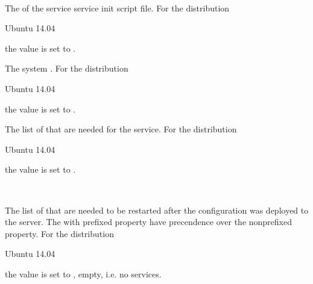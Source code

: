 \\

The  of the service service init script file.
For the distribution
\begin{inparaitem}
\item[\TheDistribution{ubuntu}] Ubuntu 14.04
\end{inparaitem}
the value is set to .


The system . 
For the distribution
\begin{inparaitem}
\item[\TheDistribution{ubuntu}] Ubuntu 14.04
\end{inparaitem}
the value is set to .


The list of  that are needed for the service.
For the distribution
\begin{inparaitem}
\item[\TheDistribution{ubuntu}] Ubuntu 14.04
\end{inparaitem}
the value is set to .

\\

The list of  that are needed to be restarted after the 
configuration was deployed to the server. The with  prefixed 
property have precendence over the nonprefixed property.
For the distribution
\begin{inparaitem}
\item[\TheDistribution{ubuntu}] Ubuntu 14.04
\end{inparaitem}
the value is set to \qcode{}, empty, i.e. no services.

